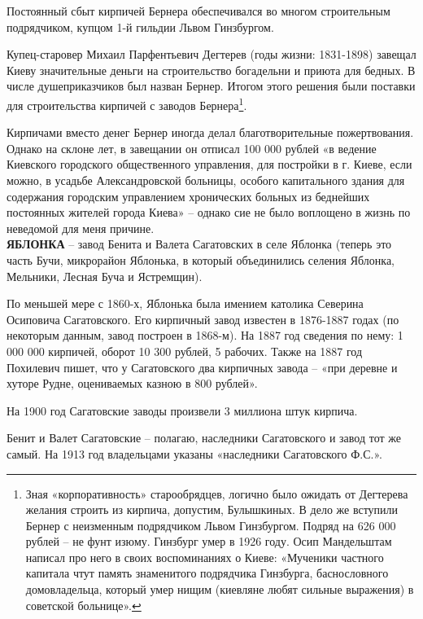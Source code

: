Постоянный сбыт кирпичей Бернера обеспечивался во многом строительным подрядчиком, купцом 1-й гильдии Львом Гинзбургом.

Купец-старовер Михаил Парфентьевич Дегтерев (годы жизни: 1831-1898) завещал Киеву значительные деньги на строительство богадельни и приюта для бедных. В числе душеприказчиков был назван Бернер. Итогом этого решения были поставки для строительства кирпичей с заводов Бернера\footnote{Зная «корпоративность» старообрядцев, логично было ожидать от Дегтерева желания строить из кирпича, допустим, Булышкиных. В дело же вступили Бернер с неизменным подрядчиком Львом Гинзбургом. Подряд на  626 000 рублей – не фунт изюму. Гинзбург умер в 1926 году. Осип Мандельштам написал про него в своих воспоминаниях о Киеве: «Мученики частного капитала чтут память знаменитого подрядчика Гинзбурга, баснословного домовладельца, который умер нищим (киевляне любят сильные выражения) в советской больнице».}. 

Кирпичами вместо денег Бернер иногда делал благотворительные пожертвования. Однако на склоне лет, в завещании он отписал 100 000 рублей «в ведение Киевского городского общественного управления, для постройки в г. Киеве, если можно, в усадьбе Александровской больницы, особого капитального здания для содержания городским управлением хронических больных из беднейших постоянных жителей города Киева» – однако сие не было воплощено в жизнь по неведомой для меня причине.\\

\noindent\textbf{ЯБЛОНКА} – завод Бенита и Валета Сагатовских в селе Яблонка (теперь это часть Бучи, микрорайон Яблонька, в который объединились селения Яблонка, Мельники, Лесная Буча и Ястремщин). 

По меньшей мере с 1860-х, Яблонька была имением католика Северина Осиповича Сагатовского. Его кирпичный завод известен в 1876-1887 годах (по некоторым данным, завод построен в 1868-м). На 1887 год сведения по нему: 1 000 000 кирпичей, оборот 10 300 рублей, 5 рабочих. Также на 1887 год Похилевич пишет\cite{pohyluezd}, что у Сагатовского два кирпичных завода – «при деревне и хуторе Рудне, оцениваемых казною в 800 рублей».

На 1900 год Сагатовские заводы произвели 3 миллиона штук кирпича.

Бенит и Валет Сагатовские – полагаю, наследники Сагатовского и завод тот же самый. На 1913 год владельцами указаны «наследники Сагатовского Ф.С.».%

